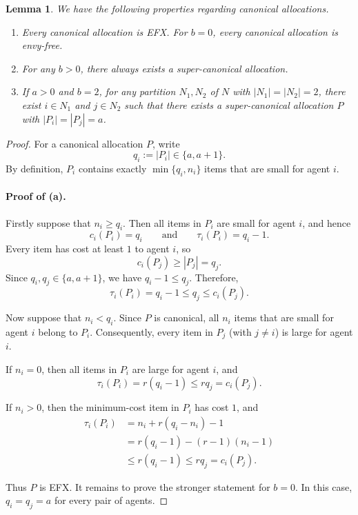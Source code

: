 \documentclass{article}
\newtheorem{lemma}{Lemma}
\theoremstyle{definition}
\begin{document}
\begin{lemma}\label{lem:canonical}
    We have the following properties regarding canonical allocations.
    \begin{enumerate}[label=(\alph*)]
        \item Every canonical allocation is EFX. For $b=0$, every canonical allocation is envy-free.
        \item For any $b>0$, there always exists a super-canonical allocation.
        \item If $a>0$ and $b=2$, for any partition $N_1,N_2$ of $N$ with $|N_1|=|N_2|=2$, there exist $i\in N_1$ and $j\in N_2$ such that there exists a super-canonical allocation $P$ with $|P_i|=|P_j|=a$.
    \end{enumerate}
\end{lemma}
\begin{proof}
For a canonical allocation $P$, write
\[
    q_i:=|P_i|\in\{a,a+1\}.
\]
By definition, $P_i$ contains exactly $\min\{q_i,n_i\}$ items that
are small for agent $i$.

\paragraph{Proof of (a).}

Firstly suppose that $n_i\ge q_i$.  Then all items in $P_i$ are small
for agent $i$, and hence
\[
    c_i(P_i)=q_i
    \qquad\text{and}\qquad
    \tau_i(P_i)=q_i-1.
\]
Every item has cost at least $1$ to agent $i$, so
\[
    c_i(P_j)\ge |P_j|=q_j.
\]
Since $q_i,q_j\in\{a,a+1\}$, we have $q_i-1\le q_j$.  Therefore,
\[
    \tau_i(P_i)=q_i-1\le q_j\le c_i(P_j).
\]

Now suppose that $n_i<q_i$.  Since $P$ is canonical, all $n_i$
items that are small for agent $i$ belong to $P_i$.  Consequently,
every item in $P_j$ (with $j\neq i$) is large for agent $i$.

If $n_i=0$, then all items in $P_i$ are large for agent $i$, and
\[
    \tau_i(P_i)=r(q_i-1)
    \le rq_j
    =c_i(P_j).
\]

If $n_i>0$, then the minimum-cost item in $P_i$ has cost $1$, and
\[
\begin{aligned}
    \tau_i(P_i)
        &=n_i+r(q_i-n_i)-1\\
        &=r(q_i-1)-(r-1)(n_i-1)\\
        &\le r(q_i-1)\le rq_j=c_i(P_j).
\end{aligned}
\]

Thus $P$ is EFX.
It remains to prove the stronger statement for $b=0$.  In this case,
$q_i=q_j=a$ for every pair of agents.


\end{proof}
\end{document}
